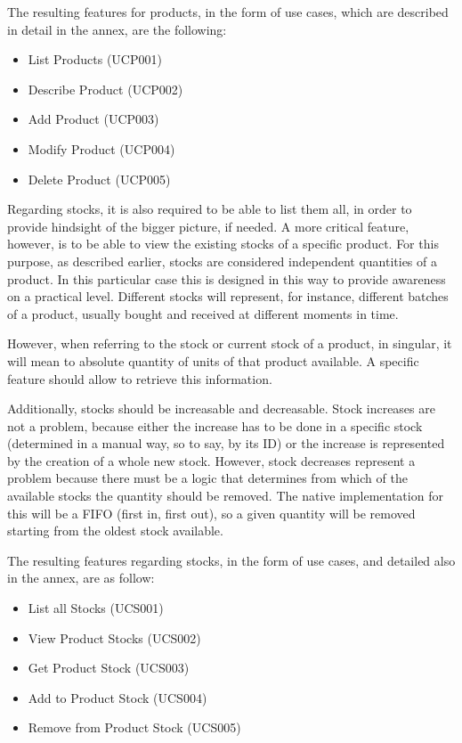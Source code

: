 The resulting features for products, in the form of use cases, which are described in detail in the annex, are the following:

\begin{itemize}
\item List Products (UCP001)
\item Describe Product (UCP002)
\item Add Product (UCP003)
\item Modify Product (UCP004)
\item Delete Product (UCP005)
\end{itemize}

Regarding stocks, it is also required to be able to list them all, in order to provide hindsight of the bigger picture, if needed. A more critical feature, however, is to be able to view the existing stocks of a specific product. For this purpose, as described earlier, stocks are considered independent quantities of a product. In this particular case this is designed in this way to provide awareness on a practical level. Different stocks will represent, for instance, different batches of a product, usually bought and received at different moments in time.

However, when referring to the stock or current stock of a product, in singular, it will mean to absolute quantity of units of that product available. A specific feature should allow to retrieve this information.

Additionally, stocks should be increasable and decreasable. Stock increases are not a problem, because either the increase has to be done in a specific stock (determined in a manual way, so to say, by its ID) or the increase is represented by the creation of a whole new stock. However, stock decreases represent a problem because there must be a logic that determines from which of the available stocks the quantity should be removed. The native implementation for this will be a FIFO (first in, first out), so a given quantity will be removed starting from the oldest stock available.

The resulting features regarding stocks, in the form of use cases, and detailed also in the annex, are as follow:

\begin{itemize}
\item List all Stocks (UCS001)
\item View Product Stocks (UCS002)
\item Get Product Stock (UCS003)
\item Add to Product Stock (UCS004)
\item Remove from Product Stock (UCS005)
\end{itemize}

